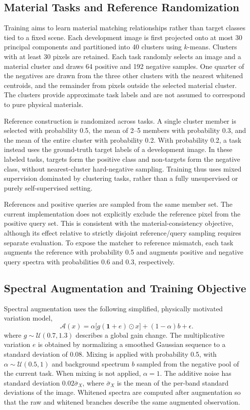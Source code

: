 \documentclass[a4paper,11pt]{article}
\begin{document}
\subsection{Material Tasks and Reference Randomization}
Training aims to learn material matching relationships rather than target classes tied to a fixed scene. Each development image is first projected onto at most 30 principal components and partitioned into 40 clusters using $k$-means. Clusters with at least 30 pixels are retained. Each task randomly selects an image and a material cluster and draws 64 positive and 192 negative samples. One quarter of the negatives are drawn from the three other clusters with the nearest whitened centroids, and the remainder from pixels outside the selected material cluster. The clusters provide approximate task labels and are not assumed to correspond to pure physical materials.

Reference construction is randomized across tasks. A single cluster member is selected with probability 0.5, the mean of 2--5 members with probability 0.3, and the mean of the entire cluster with probability 0.2. With probability 0.2, a task instead uses the ground-truth target labels of a development image. In these labeled tasks, targets form the positive class and non-targets form the negative class, without nearest-cluster hard-negative sampling. Training thus uses mixed supervision dominated by clustering tasks, rather than a fully unsupervised or purely self-supervised setting.

References and positive queries are sampled from the same member set. The current implementation does not explicitly exclude the reference pixel from the positive query set. This is consistent with the material-consistency objective, although its effect relative to strictly disjoint reference/query sampling requires separate evaluation. To expose the matcher to reference mismatch, each task augments the reference with probability 0.5 and augments positive and negative query spectra with probabilities 0.6 and 0.3, respectively.

\subsection{Spectral Augmentation and Training Objective}
Spectral augmentation uses the following simplified, physically motivated variation model,
\begin{equation}
\mathcal A(x)=\alpha\big[g(\bm 1+e)\odot x\big]+(1-\alpha)b+\epsilon.
\end{equation}
where $g\sim\mathcal U(0.7,1.3)$ describes a global gain change. The multiplicative variation $e$ is obtained by normalizing a smoothed Gaussian sequence to a standard deviation of 0.08. Mixing is applied with probability 0.5, with $\alpha\sim\mathcal U(0.5,1)$ and background spectrum $b$ sampled from the negative pool of the current task. When mixing is not applied, $\alpha=1$. The additive noise has standard deviation $0.02\bar\sigma_X$, where $\bar\sigma_X$ is the mean of the per-band standard deviations of the image. Whitened spectra are computed after augmentation so that the raw and whitened branches describe the same augmented observation.
\end{document}

